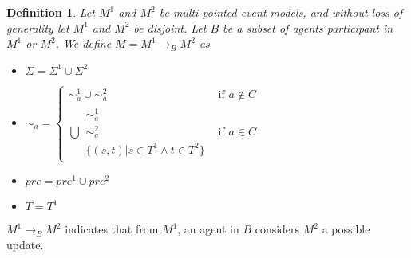 \documentclass[12pt, a4paper, titlepage]{scrartcl}
\newtheorem{defn}{Definition}
\begin{document}
\begin{defn} \label{possOne}
Let $M^1$ and $M^2$ be multi-pointed event models, and without loss of
generality let $M^1$ and $M^2$ be disjoint.
Let $B$ be a subset of agents participant in $M^1$ or $M^2$.
We define $M = M^1 \to_B M^2$ as 
\begin{itemize}
  \item $\Sigma = \Sigma^1 \cup \Sigma^2$
  \item $\sim_a =
  \begin{cases}
    \sim^1_a \cup \sim^2_a & \text{if } a \notin C \\
    \displaystyle\bigcup \begin{array}{c}
      \sim^1_a \\
      \sim^2_a \\
      \{(s,t) | s \in T^1 \land t \in T^2 \}
    \end{array} & \text{if } a \in C 
  \end{cases}$
  \item $pre = pre^1 \cup pre^2$
  \item $T = T^1$
\end{itemize}
\end{defn}

$M^1 \to_B M^2$ indicates that from $M^1$, an agent in $B$ considers $M^2$ a possible
update.

\end{document}
